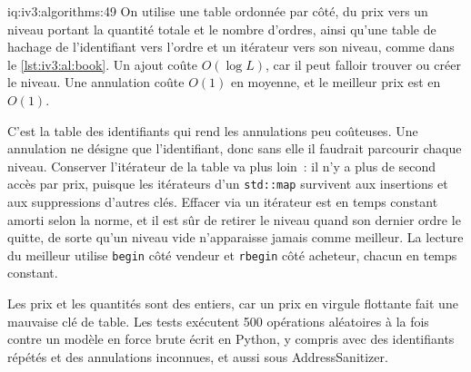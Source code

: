 \begin{solution}{iq:iv3:algorithms:49}
On utilise une table ordonnée par côté, du prix vers un niveau portant la quantité totale et le nombre d'ordres, ainsi qu'une table de hachage de l'identifiant vers l'ordre et un itérateur vers son niveau, comme dans le \cref{lst:iv3:al:book}. Un ajout coûte $O(\log L)$, car il peut falloir trouver ou créer le niveau. Une annulation coûte $O(1)$ en moyenne, et le meilleur prix est en $O(1)$.
\label{lst:iv3:al:book}

C'est la table des identifiants qui rend les annulations peu coûteuses. Une annulation ne désigne que l'identifiant, donc sans elle il faudrait parcourir chaque niveau. Conserver l'itérateur de la table va plus loin~: il n'y a plus de second accès par prix, puisque les itérateurs d'un \texttt{std::map} survivent aux insertions et aux suppressions d'autres clés. Effacer via un itérateur est en temps constant amorti selon la norme, et il est sûr de retirer le niveau quand son dernier ordre le quitte, de sorte qu'un niveau vide n'apparaisse jamais comme meilleur. La lecture du meilleur utilise \texttt{begin} côté vendeur et \texttt{rbegin} côté acheteur, chacun en temps constant.

Les prix et les quantités sont des entiers, car un prix en virgule flottante fait une mauvaise clé de table. Les tests exécutent 500 opérations aléatoires à la fois contre un modèle en force brute écrit en Python, y compris avec des identifiants répétés et des annulations inconnues, et aussi sous AddressSanitizer.

\end{solution}

